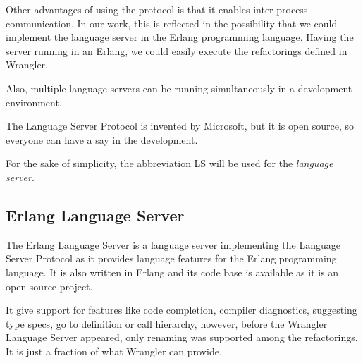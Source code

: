 Other advantages of using the protocol is that it enables inter-process communication. In our work, this is reflected in the possibility that we could implement the language server in the Erlang programming language. Having the server running in an Erlang, we could easily execute the refactorings defined in Wrangler.

Also, multiple language servers can be running simultaneously in a development environment.

The Language Server Protocol is invented by Microsoft, but it is open source, so everyone can have a say in the development.

For the sake of simplicity, the abbreviation LS will be used for the \emph{ language server}. 

\subsection{Erlang Language Server}

The Erlang Language Server \cite{ELSHome} is a language server implementing the Language Server Protocol as it provides language features for the Erlang programming language. It is also written in Erlang and its code base is available as it is an open source project.

It give support for features like code completion, compiler diagnostics, suggesting type specs, go to definition or call hierarchy, however, before the Wrangler Language Server appeared, only renaming was supported among the refactorings. It is just a fraction of what Wrangler can provide.